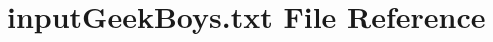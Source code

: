 \hypertarget{inputGeekBoys_8txt}{}\section{input\+Geek\+Boys.\+txt File Reference}
\label{inputGeekBoys_8txt}

